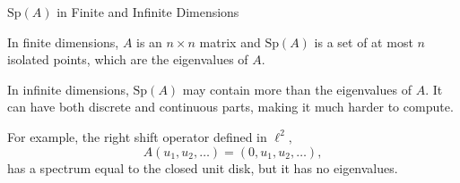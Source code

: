 \documentclass[aspectratio=169]{beamer}
\begin{document}
\begin{frame}{$\text{Sp}(A)$ in Finite and Infinite Dimensions}

In finite dimensions, $A$ is an $n \times n$ matrix and $\text{Sp}(A)$ is a set of at most $n$ isolated points, which are the eigenvalues of $A.$


\vspace{2em}

In infinite dimensions, $\text{Sp}(A)$ may contain more than the eigenvalues of $A.$ It can have both discrete and continuous parts, making it much harder to compute. 

\vspace{2em}

For example, the right shift operator defined in $\ell^2,$
$$ A(u_1, u_2, \dots) = (0, u_1, u_2, \dots),$$
has a spectrum equal to the closed unit disk, but it has no eigenvalues. 






\end{frame}


\end{document}
